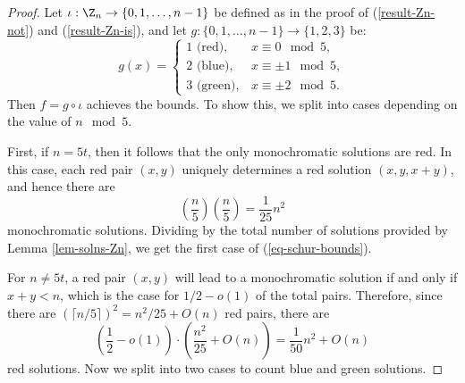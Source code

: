 \begin{proof}
Let $\iota : \Z_n \to \{0,1,\dots,n-1\}$ be defined as in the proof of (\ref{result-Zn-not}) and (\ref{result-Zn-is}), and let $g : \{0,1,\dots,n-1\} \to \{1,2,3\}$ be:
\begin{equation}
g(x) =
\begin{cases}
1 \text{ (red)}, & x \equiv 0 \mod 5, \\
2 \text{ (blue)}, & x \equiv \pm 1 \mod 5, \\
3 \text{ (green)}, & x \equiv \pm 2 \mod 5.
\end{cases}
\end{equation}
Then $f = g \circ \iota$ achieves the bounds. To show this, we split into cases depending on the value of $n \mod 5$.

First, if $n = 5t$, then it follows that the only monochromatic solutions are red. 
In this case, each red pair $(x, y)$ uniquely determines a red solution $(x, y, x + y)$, 
and hence there are 
\begin{equation}
\left(\frac{n}{5}\right)\left(\frac{n}{5}\right) = \frac{1}{25}n^2
\end{equation}
monochromatic solutions. 
Dividing by the total number of solutions
provided by Lemma \ref{lem-solns-Zn}, we get the first case of (\ref{eq-schur-bounds}). 

For $n \neq 5t$, a red pair $(x,y)$ will lead to a monochromatic solution if and only if $x + y < n$,
which is the case for $1/2 - o(1)$ of the total pairs.
Therefore, since there are $(\lceil n/5 \rceil)^2 = n^2/25 + O(n)$ red pairs, there are
\begin{equation}
\left( \frac{1}{2} - o(1) \right) \cdot \left(\frac{n^2}{25} + O(n)\right) = \frac{1}{50}n^2 + O(n)
\end{equation}
red solutions.
Now we split into two cases to count blue and green solutions.


\end{proof}
